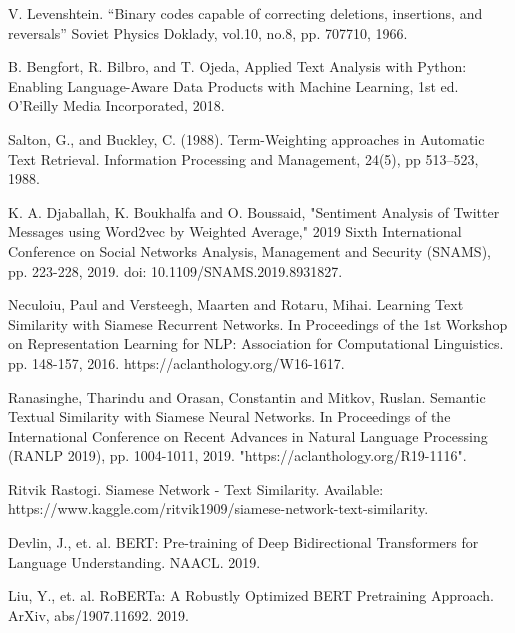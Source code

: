 \documentclass[conference]{IEEEtran}
\begin{document}
\begin{thebibliography}{00}
 V. Levenshtein. “Binary codes capable of correcting deletions, insertions, and reversals” Soviet Physics Doklady, vol.10, no.8, pp. 707­710, 1966.

 B. Bengfort, R. Bilbro, and T. Ojeda, Applied Text Analysis with Python: Enabling Language-Aware Data Products with Machine Learning, 1st ed.
O’Reilly Media Incorporated, 2018.

 Salton, G., and Buckley, C. (1988). Term-Weighting approaches in Automatic Text Retrieval. Information Processing and Management, 24(5), pp 513–523, 1988.

 K. A. Djaballah, K. Boukhalfa and O. Boussaid, "Sentiment Analysis of Twitter Messages using Word2vec by Weighted Average," 2019 Sixth International Conference on Social Networks Analysis, Management and Security (SNAMS), pp. 223-228, 2019. doi: 10.1109/SNAMS.2019.8931827.

 Neculoiu, Paul  and Versteegh, Maarten  and Rotaru, Mihai. Learning Text Similarity with Siamese Recurrent Networks. In Proceedings of the 1st Workshop on Representation Learning for NLP: Association for Computational Linguistics. pp. 148-157, 2016. https://aclanthology.org/W16-1617.

 Ranasinghe, Tharindu  and Orasan, Constantin  and  Mitkov, Ruslan. Semantic Textual Similarity with Siamese Neural Networks. In Proceedings of the International Conference on Recent Advances in Natural Language Processing (RANLP 2019), pp.  1004-1011, 2019. "https://aclanthology.org/R19-1116".

 Ritvik Rastogi. Siamese Network - Text Similarity. Available: https://www.kaggle.com/ritvik1909/siamese-network-text-similarity. 

 Devlin, J., et. al. BERT: Pre-training of Deep Bidirectional Transformers for Language Understanding. NAACL. 2019.

Liu, Y., et. al. RoBERTa: A Robustly Optimized BERT Pretraining Approach. ArXiv, abs/1907.11692. 2019.

\end{thebibliography}
\vspace{12pt}
\color{red}
\end{document}
